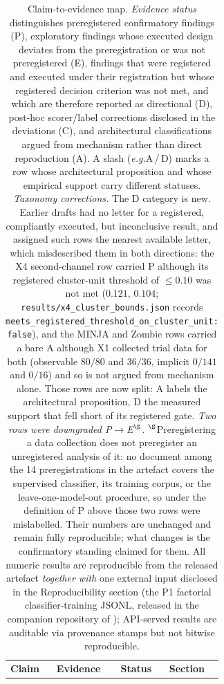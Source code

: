 \documentclass{article}
\newcommand{\eg}{\textit{e.g.}}
\begin{document}
\begingroup
\small
\setlength{\LTcapwidth}{\textwidth}
\begin{longtable}{@{}p{}p{}p{}p{}@{}}
\caption{Claim-to-evidence map. \emph{Evidence status} distinguishes preregistered confirmatory findings (P), exploratory findings whose executed design deviates from the preregistration or was not preregistered (E), findings that were registered and executed under their registration but whose registered decision criterion was not met, and which are therefore reported as directional (D), post-hoc scorer/label corrections disclosed in the deviations (C), and architectural classifications argued from mechanism rather than direct reproduction (A). A slash (\eg A\,/\,D) marks a row whose architectural proposition and whose empirical support carry different statuses. \emph{Taxonomy corrections.} The D category is new. Earlier drafts had no letter for a registered, compliantly executed, but inconclusive result, and assigned such rows the nearest available letter, which misdescribed them in both directions: the X4 second-channel row carried P although its registered cluster-unit threshold of ${\leq}0.10$ was not met ($0.121$, $0.104$; \texttt{results/x4\_cluster\_bounds.json} records \texttt{meets\_registered\_threshold\_on\_cluster\_unit: false}), and the MINJA and Zombie rows carried a bare A although X1 collected trial data for both (observable $80/80$ and $36/36$, implicit $0/141$ and $0/16$) and so is not argued from mechanism alone. Those rows are now split: A labels the architectural proposition, D the measured support that fell short of its registered gate. \emph{Two rows were downgraded P${\to}$E$^{\S}$.} $^{\S}$Preregistering a data collection does not preregister an unregistered analysis of it: no document among the 14 preregistrations in the artefact covers the supervised classifier, its training corpus, or the leave-one-model-out procedure, so under the definition of P above those two rows were mislabelled. Their numbers are unchanged and remain fully reproducible; what changes is the confirmatory standing claimed for them. All numeric results are reproducible from the released artefact \emph{together with} one external input disclosed in the Reproducibility section (the P1 factorial classifier-training JSONL, released in the companion repository of \citet{leong2026defense}); API-served results are auditable via provenance stamps but not bitwise reproducible.}
\label{tab:claim-evidence}\\
\toprule
\textbf{Claim} & \textbf{Evidence} & \textbf{Status} & \textbf{Section} \\

\end{longtable}
\end{document}
